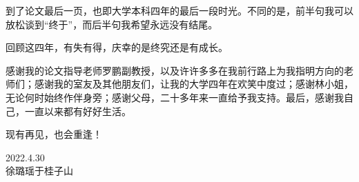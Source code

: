 \Acknowledgements


到了论文最后一页，也即大学本科四年的最后一段时光。不同的是，前半句我可以放松谈到“终于”，而后半句我希望永远没有结尾。

回顾这四年，有失有得，庆幸的是终究还是有成长。

感谢我的论文指导老师罗鹏副教授，以及许许多多在我前行路上为我指明方向的老师们；感谢我的室友及其他朋友们，让我的大学四年在欢笑中度过；感谢林小姐，无论何时始终作伴身旁；感谢父母，二十多年来一直给予我支持。最后，感谢我自己，一直以来都有好好生活。

现有再见，也会重逢！


\begin{signature}
2022.4.30\\
徐璐瑶于桂子山
\end{signature}